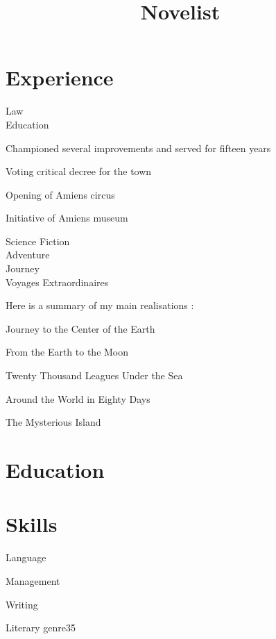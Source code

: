 \documentclass[a4paper,11pt]{cv4tw}%
\title{Novelist}
\begin{document}
\section{Experience}
{Law\\Education}
	{ Championed several improvements and served for fifteen years
	\begin{missions}
		\item Voting critical decree for the town
		\item Opening of Amiens circus
		\item Initiative of Amiens museum
	\end{missions}
}
	{Science Fiction\\Adventure\\Journey\\Voyages Extraordinaires}
	{Here is a summary of my main realisations :
	\begin{missions}
		\item Journey to the Center of the Earth
		\item From the Earth to the Moon 
		\item Twenty Thousand Leagues Under the Sea
		\item Around the World in Eighty Days
		\item The Mysterious Island
	\end{missions}
}
\section{Education}
\section{Skills}
\begin{skills} {Language}
\end{skills}
\begin{skills}{Management}
\end{skills}
\begin{skills}{Writing}
\end{skills}
\begin{fields}{Literary genre}{3}{5}
\end{fields}
\end{document}
